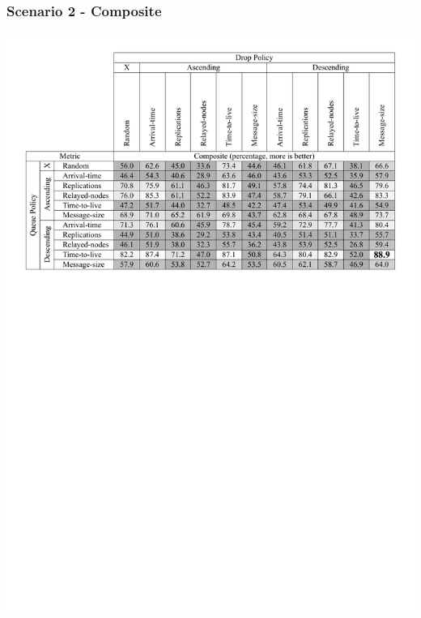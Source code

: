 \begin{frame}
  \frametitle{Scenario 2 - Composite}
  \begin{center}
   \includegraphics[width=1.0\textwidth]{fig/tables/scenario2_part4.pdf}
  \end{center}
\end{frame}